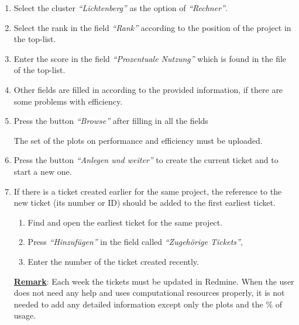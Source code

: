 \documentclass[12pt,a4paper,onecolumn]{article}
\begin{document}
\begin{enumerate}
\item Select the cluster \textit{``Lichtenberg''} as the option of \textit{``Rechner''}.

\item Select the rank in the field \textit{``Rank''} according to the position of the project in the top-list.

\item Enter the score in the field \textit{``Prozentuale Nutzung''} which is found in the file of the top-list.

\item Other fields are filled in according to the provided information, if there are some problems with efficiency.

\item Press the button \textit{``Browse''} after filling in all the fields

The set of the plots on performance and efficiency must be uploaded.

\item Press the button \textit{``Anlegen und weiter''} to create the current ticket and to start a new one.

\item If there is a ticket created earlier for the same project, the reference to the new ticket (its number or ID) should be added to the first earliest ticket.

\begin{enumerate}
\item Find and open the earliest ticket for the same project.
\item Press \textit{``Hinzuf\"ugen''} in the field called \textit{``Zugeh\"orige Tickets''},
\item Enter the number of the ticket created recently.
\end{enumerate}
\vspace{\baselineskip}

\underline{\textbf{Remark}}: Each week the tickets must be updated in Redmine.
When the user does not need any help and uses computational resources properly, it is not needed to add any detailed information except only the plots and the \% of usage.
\vspace{\baselineskip}

\end{enumerate} 

\end{document}
